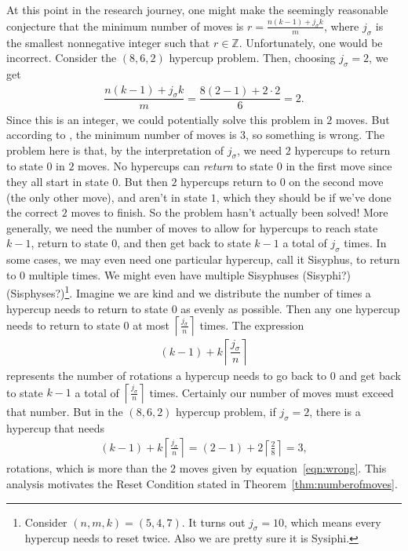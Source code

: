 \documentclass{article}
\theoremstyle{theorem}
\theoremstyle{definition}
\begin{document}
At this point in the research journey, one might make the seemingly reasonable conjecture that the minimum number of moves is $r = \frac{n(k-1)+j_\sigma k}{m}$, where $j_\sigma$ is the smallest nonnegative integer such that  $r\in \mathbb{Z}$. Unfortunately, one would be incorrect. Consider the $(8,6,2)$ hypercup problem. Then, choosing $j_\sigma = 2$, we get 
\begin{align}
    \dfrac{n(k-1)+j_\sigma k}{m} = \dfrac{8(2-1)+2\cdot 2}{6} = 2.\label{eqn:wrong}
\end{align}
Since this is an integer, we could potentially solve this problem in $2$ moves.  But according to \cite{SS10}, the minimum number of moves is $3$, so something is wrong. The problem here is that, by the interpretation of $j_\sigma$, we need $2$ hypercups to return to state $0$ in $2$ moves. No hypercups can \textit{return} to state $0$ in the first move since they all start in state $0$. But then $2$ hypercups return to $0$ on the second move (the only other move), and aren't in state $1$, which they should be if we've done the correct $2$ moves to finish. So the problem hasn't actually been solved! More generally, we need the number of moves to allow for hypercups to reach state $k-1$, return to state $0$, and then get back to state $k-1$ a total of $j_\sigma$ times. In some cases, we may even need one particular hypercup, call it Sisyphus, to return to $0$ multiple times. We might even have multiple Sisyphuses (Sisyphi?) (Sisphyses?)\footnote{Consider $(n,m,k)=(5,4,7)$. It turns out $j_\sigma = 10$, which means every hypercup needs to reset twice. Also we are pretty sure it is Sysiphi.}. Imagine we are kind and we distribute the number of times a hypercup needs to return to state $0$ as evenly as possible. Then any one hypercup needs to return to state $0$ at most $\left\lceil \frac{j_\sigma}{n}\right\rceil$ times. The expression 
\begin{align*}
    (k-1) + k \left\lceil \dfrac{j_\sigma}{n}\right\rceil
\end{align*}
represents the number of rotations a hypercup needs to go back to $0$ and get back to state $k-1$ a total of $\left\lceil \frac{j_\sigma}{n}\right\rceil$ times. Certainly our number of moves must exceed that number. But in the $(8,6,2)$ hypercup problem, if $j_\sigma = 2$, there is a hypercup that needs
\begin{align*}
    (k-1) +  k\left\lceil\frac{j_\sigma}{n}\right\rceil 
    = (2-1) + 2\left\lceil\frac{2}{8}\right\rceil = 3,
\end{align*}
rotations, which is more than the $2$ moves given by equation~\ref{eqn:wrong}. This analysis motivates the Reset Condition stated in Theorem~\ref{thm:numberofmoves}. 
\end{document}

